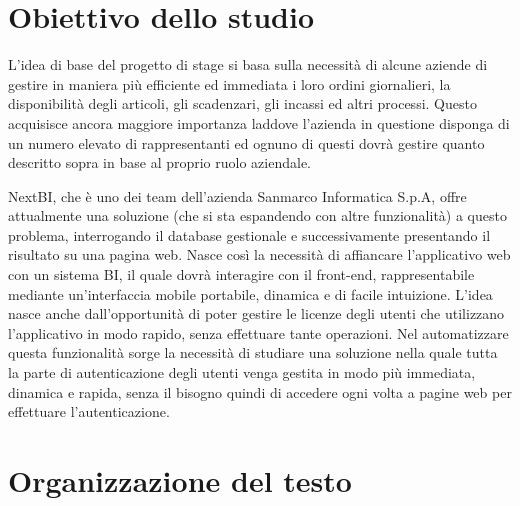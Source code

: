 \section{Obiettivo dello studio}



L'idea di base del progetto di stage si basa sulla necessità di alcune aziende di gestire in maniera più efficiente ed immediata i loro ordini giornalieri, la disponibilità degli articoli, gli scadenzari, gli incassi ed altri processi. Questo acquisisce ancora maggiore importanza laddove l'azienda in questione disponga di un numero elevato di rappresentanti ed ognuno di questi dovrà gestire quanto descritto sopra in base al proprio ruolo aziendale. 

NextBI, che è uno dei team dell'azienda Sanmarco Informatica S.p.A, offre attualmente una soluzione (che si sta espandendo con altre funzionalità) a questo problema, interrogando il database  gestionale e successivamente presentando il risultato su una pagina web. Nasce così la necessità di affiancare l'applicativo web con un sistema BI, il quale dovrà interagire con il front-end, rappresentabile mediante un'interfaccia mobile portabile, dinamica e di facile intuizione. L'idea nasce anche dall'opportunità di poter gestire le  licenze degli utenti che utilizzano l'applicativo in modo rapido, senza effettuare tante operazioni. Nel automatizzare questa funzionalità sorge la necessità di studiare una soluzione nella quale tutta la parte di autenticazione degli utenti venga gestita in modo più immediata, dinamica e rapida, senza il bisogno quindi di accedere ogni volta a pagine web per effettuare l'autenticazione.

\section{Organizzazione del testo}

